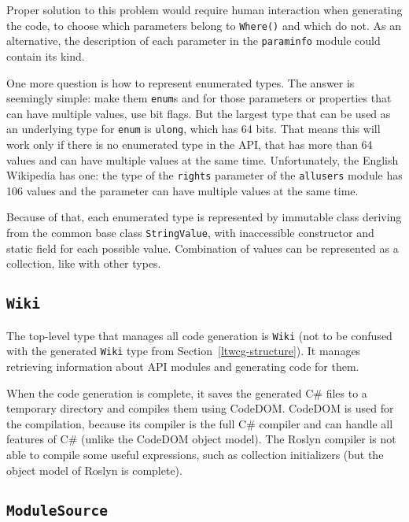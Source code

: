 Proper solution to this problem would require human interaction when generating the code,
to choose which parameters belong to \lstinline{Where()} and which do not.
As an alternative, the description of each parameter in the \texttt{paraminfo} module could contain its kind.

\medskip

One more question is how to represent enumerated types.
The answer is seemingly simple: make them \lstinline{enum}s
and for those parameters or properties that can have multiple values, use bit flags.
But the largest type that can be used as an underlying type for \lstinline{enum}
is \lstinline{ulong}, which has 64 bits.
That means this will work only if there is no enumerated type in the API,
that has more than 64 values and can have multiple values at the same time.
Unfortunately, the English Wikipedia has one:
the type of the \lstinline{rights} parameter of the \lstinline{allusers} module
has 106 values and the parameter can have multiple values at the same time.

Because of that, each enumerated type is represented by immutable class deriving from the common base class \lstinline{StringValue},
with inaccessible constructor and static field for each possible value.
Combination of values can be represented as a collection, like with other types.

\subsection{\texorpdfstring{\lstinline{Wiki}}{Wiki}}

The top-level type that manages all code generation is \lstinline{Wiki}
(not to be confused with the generated \lstinline{Wiki} type from Section~\ref{ltwcg-structure}).
It manages retrieving information about API modules and generating code for them.

When the code generation is complete, it saves the generated C\# files to a temporary directory
and compiles them using CodeDOM.
CodeDOM is used for the compilation,
because its compiler is the full C\# compiler and can handle all features of C\# (unlike the CodeDOM object model).
The Roslyn compiler is not able to compile some useful expressions, such as collection initializers
(but the object model of Roslyn is complete).

\subsection{\texorpdfstring{\lstinline{ModuleSource}}{ModuleSource}}

